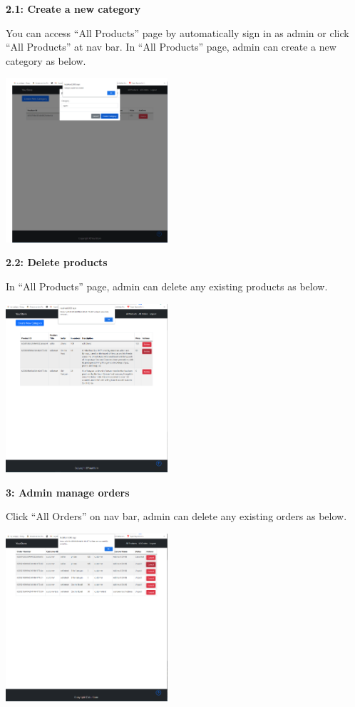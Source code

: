 \documentclass[12pt]{article}
\begin{document}
\hspace*{5mm}\textbf{2.1: Create a new category}

You can access “All Products” page by automatically sign in as admin or click “All Products”
at nav bar. In “All Products” page, admin can create a new category as below.

\includegraphics[width=0.45\textwidth]{UserGuideImage/3.png}

\newpage
\hspace*{5mm}\textbf{2.2: Delete products}

In “All Products” page, admin can delete any existing products as below.

\includegraphics[width=0.45\textwidth]{UserGuideImage/4.png}

\vspace*{5mm}
\textbf{3: Admin manage orders}

Click “All Orders” on nav bar, admin can delete any existing orders as below.

\includegraphics[width=0.45\textwidth]{UserGuideImage/5.png}
\end{document}
